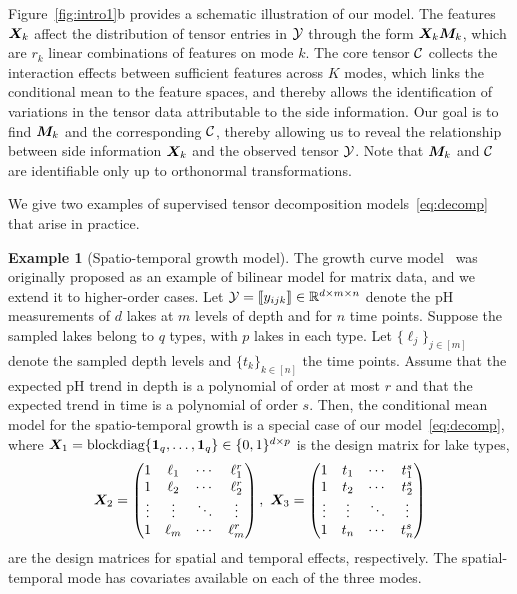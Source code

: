 \documentclass{article}
\theoremstyle{definition}
\theoremstyle{definition}
\newtheorem{example}{Example}
\begin{document}
Figure~\ref{fig:intro1}b provides a schematic illustration of our model. The features $\bm X_k$ affect the distribution of tensor entries in $\mathcal{Y}$ through the form $\bm X_k\bm M_k$, which are $r_k$ linear combinations of features on mode $k$. The core tensor $\mathcal{C}$ collects the interaction effects between sufficient features across $K$ modes, which links the conditional mean to the feature spaces, and thereby allows the identification of variations in the tensor data attributable to the side information. Our goal is to find $\bm M_k$ and the corresponding $\mathcal{C}$, thereby allowing us to reveal the relationship between side information $\bm X_k$ and the observed tensor $\mathcal{Y}$. Note that $\bm M_k$ and $\mathcal{C}$ are identifiable only up to orthonormal transformations.  

We give two examples of supervised tensor decomposition models~\eqref{eq:decomp} that arise in practice.
\begin{example}[Spatio-temporal growth model]
The growth curve model~\citep{srivastava2008models} was originally proposed as an example of bilinear model for matrix data, and we extend it to higher-order cases. Let $\mathcal{Y}=\llbracket y_{ijk} \rrbracket\in\mathbb{R}^{d \times m\times n}$ denote the pH measurements of $d$ lakes at $m$ levels of depth and for $n$ time points. Suppose the sampled lakes belong to $q$ types, with $p$ lakes in each type. Let $\{\ell_j\}_{j\in[m]}$ denote the sampled depth levels and $\{t_k\}_{k\in[n]}$ the time points. Assume that the expected pH trend in depth is a polynomial of order at most $r$ and that the expected trend in time is a polynomial of order $s$. Then, the conditional mean model for the spatio-temporal growth is a special case of our model~\eqref{eq:decomp}, where $\bm X_1=\text{blockdiag}\{\mathbf{1}_q,\ldots,\mathbf{1}_q\}\in \{0,1\}^{d\times p}$ is the design matrix for lake types, 
\[
\bm X_2=
\begin{pmatrix}
1 & \ell_1&\cdots &\ell^{r}_1\\
1 & \ell_2&\cdots &\ell^{r}_2\\
\vdots &\vdots&\ddots&\vdots\\
1&\ell_{m}&\cdots&\ell^{r}_{m}
\end{pmatrix},\
\bm X_3=
\begin{pmatrix}
1 & t_1&\cdots &t^{s}_1\\
1 & t_2&\cdots &t^{s}_2\\
\vdots &\vdots&\ddots&\vdots\\
1&t_{n}&\cdots&t^{s}_{n}
\end{pmatrix}
\]
are the design matrices for spatial and temporal effects, respectively. The spatial-temporal mode has covariates available on each of the three modes. 

\end{example}
\end{document}
